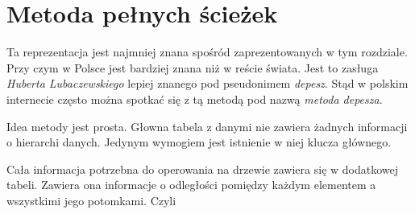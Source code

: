 \section{Metoda pełnych ścieżek}
% 




Ta reprezentacja jest najmniej znana spośród zaprezentowanych w tym rozdziale.
Przy czym w Polsce jest bardziej znana niż w reście świata.
Jest to zasługa \emph{Huberta Lubaczewskiego} lepiej znanego pod pseudonimem \emph{depesz}.
Stąd w polskim internecie często można spotkać się z tą metodą pod nazwą \emph{metoda depesza}.




Idea metody jest prosta. 
Głowna tabela z danymi nie zawiera żadnych informacji o hierarchi danych. 
Jedynym wymogiem jest istnienie w niej klucza głównego.

Cała informacja potrzebna do operowania na drzewie zawiera się w dodatkowej tabeli. 
Zawiera ona informacje o odległości pomiędzy każdym elementem a wszystkimi jego potomkami.
Czyli 

%
%
%
%
%
%  



